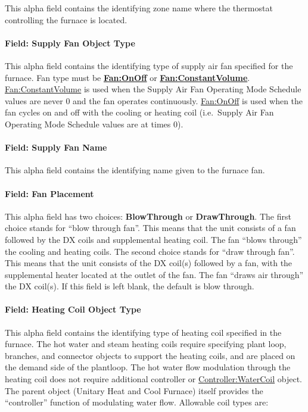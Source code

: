 This alpha field contains the identifying zone name where the thermostat controlling the furnace is located.

\paragraph{Field: Supply Fan Object Type}\label{field-supply-fan-object-type-1}

This alpha field contains the identifying type of supply air fan specified for the furnace. Fan type must be \textbf{\hyperref[fanonoff]{Fan:OnOff}} or \textbf{\hyperref[fanconstantvolume]{Fan:ConstantVolume}}. \hyperref[fanconstantvolume]{Fan:ConstantVolume} is used when the Supply Air Fan Operating Mode Schedule values are never 0 and the fan operates continuously. \hyperref[fanonoff]{Fan:OnOff} is used when the fan cycles on and off with the cooling or heating coil (i.e.~Supply Air Fan Operating Mode Schedule values are at times 0).

\paragraph{Field: Supply Fan Name}\label{field-supply-fan-name-1}

This alpha field contains the identifying name given to the furnace fan.

\paragraph{Field: Fan Placement}\label{field-fan-placement-1}

This alpha field has two choices: \textbf{BlowThrough} or \textbf{DrawThrough}. The first choice stands for ``blow through fan''. This means that the unit consists of a fan followed by the DX coils and supplemental heating coil. The fan ``blows through'' the cooling and heating coils. The second choice stands for ``draw through fan''. This means that the unit consists of the DX coil(s) followed by a fan, with the supplemental heater located at the outlet of the fan. The fan ``draws air through'' the DX coil(s). If this field is left blank, the default is blow through.

\paragraph{Field: Heating Coil Object Type}\label{field-heating-coil-object-type-1-000}

This alpha field contains the identifying type of heating coil specified in the furnace. The hot water and steam heating coils require specifying plant loop, branches, and connector objects to support the heating coils, and are placed on the demand side of the plantloop. The hot water flow modulation through the heating coil does not require additional controller or \hyperref[controllerwatercoil]{Controller:WaterCoil} object. The parent object (Unitary Heat and Cool Furnace) itself provides the ``controller'' function of modulating water flow. Allowable coil types are:

